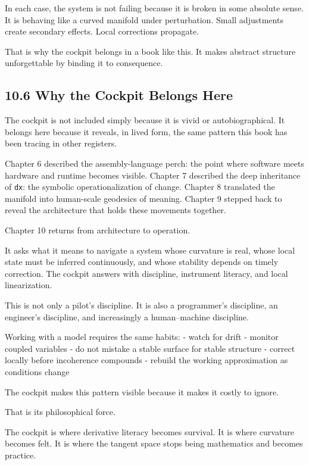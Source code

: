 \documentclass[
]{article}
\begin{document}
In each case, the system is not failing because it is broken in some
absolute sense. It is behaving like a curved manifold under
perturbation. Small adjustments create secondary effects. Local
corrections propagate.

That is why the cockpit belongs in a book like this. It makes abstract
structure unforgettable by binding it to consequence.

\hypertarget{why-the-cockpit-belongs-here}{%
\subsection{10.6 Why the Cockpit Belongs
Here}\label{why-the-cockpit-belongs-here}}

The cockpit is not included simply because it is vivid or
autobiographical. It belongs here because it reveals, in lived form, the
same pattern this book has been tracing in other registers.

Chapter 6 described the assembly-language perch: the point where
software meets hardware and runtime becomes visible. Chapter 7 described
the deep inheritance of \texttt{dx}: the symbolic operationalization of
change. Chapter 8 translated the manifold into human-scale geodesics of
meaning. Chapter 9 stepped back to reveal the architecture that holds
these movements together.

Chapter 10 returns from architecture to operation.

It asks what it means to navigate a system whose curvature is real,
whose local state must be inferred continuously, and whose stability
depends on timely correction. The cockpit answers with discipline,
instrument literacy, and local linearization.

This is not only a pilot's discipline. It is also a programmer's
discipline, an engineer's discipline, and increasingly a human--machine
discipline.

Working with a model requires the same habits: - watch for drift -
monitor coupled variables - do not mistake a stable surface for stable
structure - correct locally before incoherence compounds - rebuild the
working approximation as conditions change

The cockpit makes this pattern visible because it makes it costly to
ignore.

That is its philosophical force.

The cockpit is where derivative literacy becomes survival. It is where
curvature becomes felt. It is where the tangent space stops being
mathematics and becomes practice.
\end{document}
